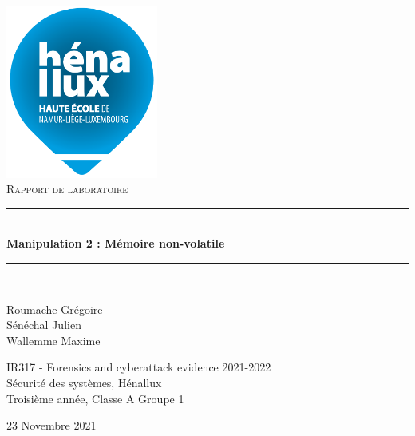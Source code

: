 \documentclass[a4paper]{article}
\newcommand{\HRule}{\rule{\linewidth}{0.5mm}}
\begin{document}
\begin{titlepage}
    \begin{sffamily}
        \begin{center}

            \includegraphics[width=5cm]{images/LogoHenallux.PNG}~\\[1.5cm]
            \textsc{\Large Rapport de laboratoire}\\[1.5cm]

            \HRule \\[0.4cm]
            { \huge \bfseries Manipulation 2 : Mémoire non-volatile\\[0.4cm] }
            \HRule \\[2cm]

            \begin{minipage}{0.4\textwidth}
                \begin{flushleft} \large
                    Roumache Grégoire\\
                    Sénéchal Julien\\
                    Wallemme Maxime\\
                \end{flushleft}
            \end{minipage}
            \begin{minipage}{0.55\textwidth}
                \begin{flushright} \large
                    IR317 - Forensics and cyberattack evidence 2021-2022\\
                    Sécurité des systèmes, Hénallux\\
                    Troisième année, Classe A Groupe 1 \\
                \end{flushright}
            \end{minipage}
            \vfill

            {\large 23 Novembre 2021}

        \end{center}
    \end{sffamily}
\end{titlepage}
\end{document}
